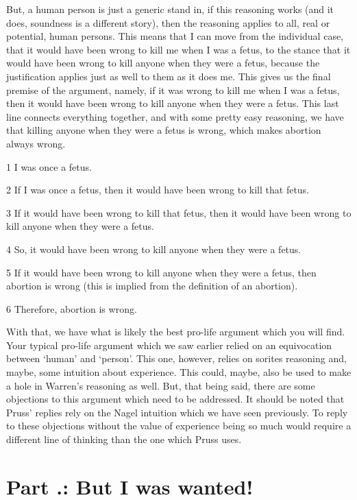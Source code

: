 But, a human person is just a generic stand in, if this reasoning works (and it does, soundness is a different story), then the reasoning applies to all, real or potential, human persons. This means that I can move from the individual case, that it would have been wrong to kill me when I was a fetus, to the stance that it would have been wrong to kill anyone when they were a fetus, because the justification applies just as well to them as it does me. This gives us the final premise of the argument, namely, if it was wrong to kill me when I was a fetus, then it would have been wrong to kill anyone when they were a fetus. This last line connects everything together, and with some pretty easy reasoning, we have that killing anyone when they were a fetus is wrong, which makes abortion always wrong. 
\begin{earg}
    \item[1] I was once a fetus.
    \item[2] If I was once a fetus, then it would have been wrong to kill that fetus.
    \item[3] If it would have been wrong to kill that fetus, then it would have been wrong to kill anyone when they were a fetus. 
    \item[4] So, it would have been wrong to kill anyone when they were a fetus.
    \item[5] If it would have been wrong to kill anyone when they were a fetus, then abortion is wrong (this is implied from the definition of an abortion). 
    \item[6] Therefore, abortion is wrong.
\end{earg}
With that, we have what is likely the best pro-life argument which you will find. Your typical pro-life argument which we saw earlier relied on an equivocation between `human' and `person'. This one, however, relies on sorites reasoning and, maybe, some intuition about experience. This could, maybe, also be used to make a hole in Warren's reasoning as well. But, that being said, there are some objections to this argument which need to be addressed. It should be noted that Pruss' replies rely on the Nagel intuition which we have seen previously. To reply to these objections without the value of experience being so much would require a different line of thinking than the one which Pruss uses. 
\section{Part \thechapcount.\theseccount: But I was wanted!}

